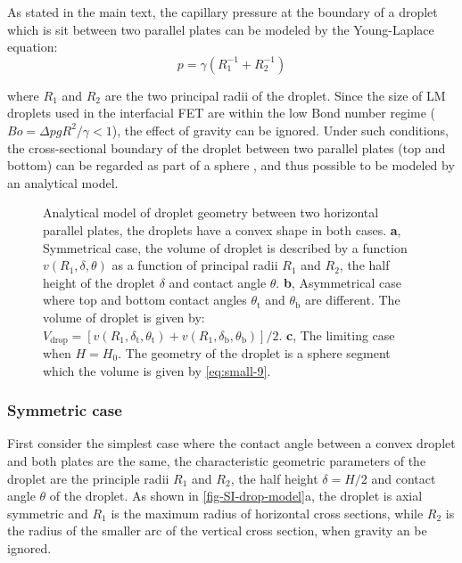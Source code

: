 As stated in the main text, the capillary pressure at the boundary of a droplet which is sit
between two parallel plates can be modeled by the Young-Laplace
equation:
\begin{equation}
\label{eq:small-3}
p = \gamma (R_{1}^{-1} + R_{2}^{-1})
\end{equation}

where \(R_{1}\) and \(R_{2}\) are the two principal radii of the
droplet. Since the size of LM droplets used in the interfacial FET are
within the low Bond number regime (\(Bo = \Delta p g R^{2} / \gamma <
1\)), the effect of gravity can be ignored. Under such conditions,
the cross-sectional boundary of the droplet between two parallel
plates (top and bottom) can be regarded as part of a sphere
\cite{berthier_2012_microdroplet}, and thus possible to be modeled by an
analytical model.

\begin{figure}[htbp]
\centering
{}
\caption{\label{fig-SI-drop-model}%
  Analytical model of droplet geometry between two horizontal parallel
  plates, the droplets have a convex shape in both cases. \textbf{a},
  Symmetrical case, the volume of droplet is described by a function
  \(v(R_{1}, \delta, \theta)\) as a function of principal radii
  \(R_{1}\) and \(R_{2}\), the half height of the droplet \(\delta\)
  and contact angle \(\theta\). \textbf{b}, Asymmetrical case where
  top and bottom contact angles \(\theta_{\mathrm{t}}\) and
  \(\theta_{\mathrm{b}}\) are different. The volume of droplet is
  given by:
  \(V_{\mathrm{drop}} = [v(R_{1}, \delta_{\mathrm{t}},
  \theta_{\mathrm{t}}) + v(R_{1}, \delta_{\mathrm{b}},
  \theta_{\mathrm{b}})]/2\). \textbf{c}, The limiting case when
  \(H=H_{0}\). The geometry of the droplet is a sphere segment which
  the volume is given by \autoref{eq:small-9}.  }
\end{figure}

\subsubsection*{Symmetric case}
\label{sec:small-org5934fd4}

First consider the simplest case where the contact angle
between a convex droplet and both plates are the same, the
characteristic geometric parameters of the droplet are the principle
radii \(R_{1}\) and \(R_{2}\), the half height \(\delta=H/2\) and contact
angle \(\theta\) of the droplet. As
shown in \autoref{fig-SI-drop-model}a, the droplet is axial
symmetric and \(R_{1}\) is the maximum radius of horizontal cross
sections, while \(R_{2}\) is the radius of the smaller arc of the
vertical cross section, when gravity an be ignored.

